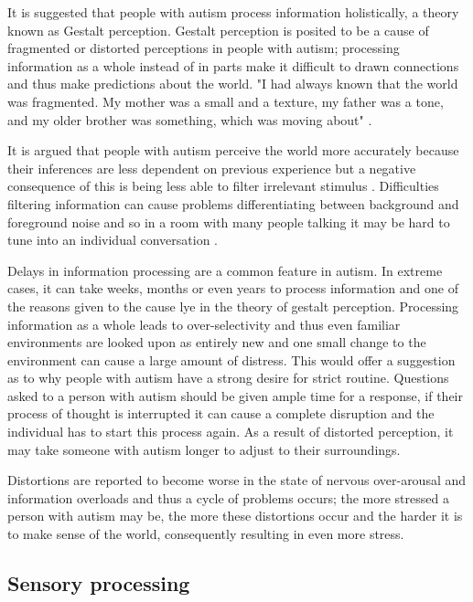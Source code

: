 \documentclass[11pt]{report}
\begin{document}
It is suggested that people with autism process information holistically, a theory known as Gestalt perception. Gestalt perception is posited to be a cause of fragmented or distorted perceptions in people with autism\cite{olgab}; processing information as a whole instead of in parts make it difficult to drawn connections and thus make predictions about the world. "I had always known that the world was fragmented. My mother was a small and a texture, my father was a tone, and my older brother was something, which was moving about" \cite{williams1992}. 

It is argued that people with autism perceive the world more accurately because their inferences are less dependent on previous experience but a negative consequence of this is being less able to filter irrelevant stimulus \cite{bayes}. Difficulties filtering information can cause problems differentiating between background and foreground noise and so in a room with many people talking it may be hard to tune into an individual conversation \cite{bayes}. 

Delays in information processing are a common feature in autism. In extreme cases, it can take weeks, months or even years to process information and one of the reasons given to the cause lye in the theory of gestalt perception. Processing information as a whole leads to over-selectivity and thus even familiar environments are looked upon as entirely new and one small change to the environment can cause a large amount of distress\cite{olgab}. This would offer a suggestion as to why people with autism have a strong desire for strict routine. Questions asked to a person with autism should be given ample time for a response, if their process of thought is interrupted it can cause a complete disruption and the individual has to start this process again\cite{olgab}. As a result of distorted perception, it may take someone with autism longer to adjust to their surroundings. 

Distortions are reported to become worse in the state of nervous over-arousal and information overloads\cite{olgab} and thus a cycle of problems occurs; the more stressed a person with autism may be, the more these distortions occur and the harder it is to make sense of the world, consequently resulting in even more stress.

\subsection{Sensory processing}
\end{document}

